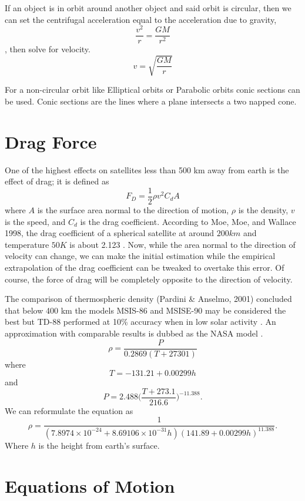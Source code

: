 If an object is in orbit around another object and said orbit is circular, then we can set the centrifugal acceleration equal to the acceleration due to gravity, $$\frac{v^2}{r}=\frac{GM}{r^2}$$, then solve for velocity.
\begin{equation}
v=\sqrt{\frac{GM}{r}}
\end{equation}

For a non-circular orbit like Elliptical orbits or Parabolic orbits conic sections can be used. Conic sections are the lines where a plane intersects a two napped cone.

\section{Drag Force}

One of the highest effects on satellites less than 500 km away from earth is the effect of drag; it is defined as $$F_D=\frac{1}{2}\rho v^2 C_d A$$ where $A$ is the surface area normal to the direction of motion, $\rho$ is the density, $v$ is the speed, and $C_d$ is the drag coefficient. According to Moe, Moe, and Wallace 1998, the drag coefficient of a spherical satellite at around $200km$ and temperature $50K$ is about 2.123 \cite{moe_moe_wallace_1998}. Now, while the area normal to the direction of velocity can change, we can make the initial estimation while the empirical extrapolation of the drag coefficient can be tweaked to overtake this error. Of course, the force of drag will be completely opposite to the direction of velocity.

The comparison of thermospheric density (Pardini \& Anselmo, 2001) concluded that below 400 km the models MSIS-86 and MSISE-90 may be considered the best but TD-88 performed at 10\% accuracy when in low solar activity \cite{pardini_anselmo_2001}. An approximation with comparable results is dubbed as the NASA model \cite{brito_celestino_moraes_2015, nasa}.
\begin{equation}
\rho=\frac{P}{0.2869(T+27301)}
\end{equation} where $$T=-131.21+0.00299h$$ and $$P=2.488\bigg(\frac{T+273.1}{216.6}\bigg)^{-11.388}.$$
We can reformulate the equation as 
\begin{equation}\label{eq:density}
\rho=\frac{1}{(7.8974\times10^{-24}+8.69106\times10^{-31}h)(141.89+0.00299h)^{11.388}}.
\end{equation} Where $h$ is the height from earth's surface.

\section{Equations of Motion}

